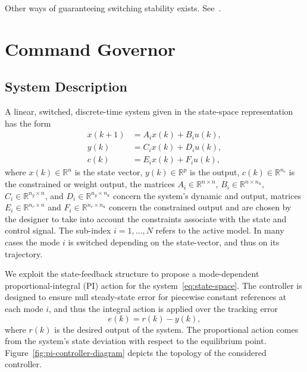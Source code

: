 Other ways of guaranteeing switching stability exists.
See~\textcite{geromel.deaecto:stability,liberzon.morse:basic,geromel.colaneri:stabilization}.

\section{Command Governor}%
\label{sec:command-governor}

\subsection{System Description}%
\label{subsec:system-description}

A linear, switched, discrete-time system given in the state-space representation
has the form
%
\begin{equation}
  \label{eq:state-space}
  \begin{aligned}
    x(k+1) & = A_{i}x(k)+B_{i}u(k), \\
    y(k)   & = C_{i}x(k)+D_{i}u(k), \\
    c(k)   & = E_{i}x(k)+F_{i}u(k),
  \end{aligned}
\end{equation}
%
where \(x(k)\in\mathbb{R}^n\) is the state vector, \(y(k)\in\mathbb{R}^p\) is the
output, \(c(k)\in\mathbb{R}^{n_c}\) is the constrained or weight output, the
matrices \(A_{i}\in\mathbb{R}^{n\times{}n}\), \(B_{i}\in\mathbb{R}^{n\times{}n_u}\),
\(C_{i}\in\mathbb{R}^{n_y\times{}n}\), and \(D_{i}\in\mathbb{R}^{n_y\times{}n_u}\) concern the
system's dynamic and output, matrices \(E_{i}\in\mathbb{R}^{n_c\times{}n}\) and
\(F_{i}\in\mathbb{R}^{n_c\times{}n_u}\) concern the constrained output and are chosen
by the designer to take into account the constraints associate with the state
and control signal. The sub-index \(i = 1,\ldots,N\) refers to the active model. In
many cases the mode \(i\) is switched depending on the state-vector, and thus on
its trajectory.

We exploit the state-feedback structure to propose a mode-dependent
proportional-integral (PI) action for the system~\eqref{eq:state-space}. The
controller is designed to ensure null steady-state error for piecewise constant
references at each mode \(i\), and thus the integral action is applied over the
tracking error~\parencite{lopes.leite.ea:anti-windup}
%
\begin{equation}
  \label{eq:r-y-error}
  e(k) = r(k)-y(k),
\end{equation}
%
where \(r(k)\) is the desired output of the system. The proportional action
comes from the system's state deviation with respect to the equilibrium point.
Figure~\ref{fig:pi-controller-diagram} depicts the topology of the considered
controller.

